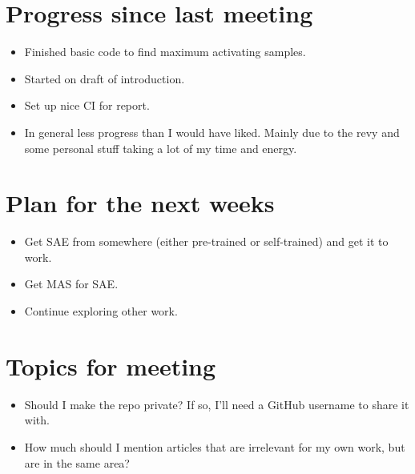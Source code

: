 \documentclass[main.tex]{subfiles}
\begin{document}
\section*{Progress since last meeting}
\begin{itemize}
    \item Finished basic code to find maximum activating samples.
    \item Started on draft of introduction.
    \item Set up nice CI for report.
    \item In general less progress than I would have liked.
    Mainly due to the revy and some personal stuff taking a lot of my time and energy.
\end{itemize}
\section*{Plan for the next weeks}
\begin{itemize}
    \item Get SAE from somewhere (either pre-trained or self-trained) and get it to work.
    \item Get MAS for SAE.
    \item Continue exploring other work.
\end{itemize}
\section*{Topics for meeting}
\begin{itemize}
    \item Should I make the repo private? If so, I'll need a GitHub username to share it with.
    \item How much should I mention articles that are irrelevant for my own work, but are in the same area?
\end{itemize}
\end{document}
